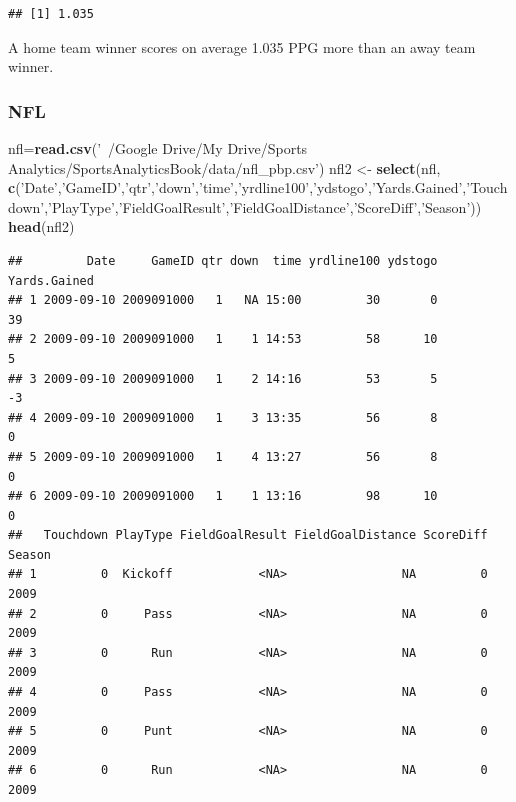 \documentclass[]{article}
\newenvironment{Shaded}{\begin{snugshade}}{\end{snugshade}}
\newcommand{\KeywordTok}[1]{\textcolor[rgb]{0.13,0.29,0.53}{\textbf{#1}}}
\newcommand{\NormalTok}[1]{#1}
\newcommand{\StringTok}[1]{\textcolor[rgb]{0.31,0.60,0.02}{#1}}
\begin{document}
\begin{verbatim}
## [1] 1.035
\end{verbatim}

A home team winner scores on average 1.035 PPG more than an away team
winner.

\hypertarget{nfl}{%
\subsubsection{NFL}\label{nfl}}

\begin{Shaded}
\begin{Highlighting}[]
\NormalTok{nfl=}\KeywordTok{read.csv}\NormalTok{(}\StringTok{'~/Google Drive/My Drive/Sports Analytics/SportsAnalyticsBook/data/nfl_pbp.csv'}\NormalTok{)}
\NormalTok{nfl2 <-}\StringTok{ }\KeywordTok{select}\NormalTok{(nfl, }\KeywordTok{c}\NormalTok{(}\StringTok{'Date'}\NormalTok{,}\StringTok{'GameID'}\NormalTok{,}\StringTok{'qtr'}\NormalTok{,}\StringTok{'down'}\NormalTok{,}\StringTok{'time'}\NormalTok{,}\StringTok{'yrdline100'}\NormalTok{,}\StringTok{'ydstogo'}\NormalTok{,}\StringTok{'Yards.Gained'}\NormalTok{,}\StringTok{'Touchdown'}\NormalTok{,}\StringTok{'PlayType'}\NormalTok{,}\StringTok{'FieldGoalResult'}\NormalTok{,}\StringTok{'FieldGoalDistance'}\NormalTok{,}\StringTok{'ScoreDiff'}\NormalTok{,}\StringTok{'Season'}\NormalTok{))}
\KeywordTok{head}\NormalTok{(nfl2)}
\end{Highlighting}
\end{Shaded}

\begin{verbatim}
##         Date     GameID qtr down  time yrdline100 ydstogo Yards.Gained
## 1 2009-09-10 2009091000   1   NA 15:00         30       0           39
## 2 2009-09-10 2009091000   1    1 14:53         58      10            5
## 3 2009-09-10 2009091000   1    2 14:16         53       5           -3
## 4 2009-09-10 2009091000   1    3 13:35         56       8            0
## 5 2009-09-10 2009091000   1    4 13:27         56       8            0
## 6 2009-09-10 2009091000   1    1 13:16         98      10            0
##   Touchdown PlayType FieldGoalResult FieldGoalDistance ScoreDiff Season
## 1         0  Kickoff            <NA>                NA         0   2009
## 2         0     Pass            <NA>                NA         0   2009
## 3         0      Run            <NA>                NA         0   2009
## 4         0     Pass            <NA>                NA         0   2009
## 5         0     Punt            <NA>                NA         0   2009
## 6         0      Run            <NA>                NA         0   2009
\end{verbatim}
\end{document}
